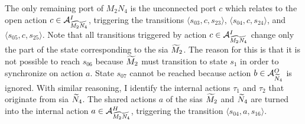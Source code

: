 The only remaining port of $\mathit{M}_2\mathit{N}_4$ is the unconnected port $c$ which relates to the open action $c \in \mathcal{A}_{\widetilde{\mathit{M}_2\mathit{N}_4}}^I$, triggering the transitions $\langle s_{03}, c, s_{23} \rangle$, $\langle s_{04}, c, s_{24} \rangle$, and $\langle s_{05}, c, s_{25} \rangle$.
Note that all transitions triggered by action $c \in \mathcal{A}_{\widetilde{\mathit{M}_2\mathit{N}_4}}^I$ change only the part of the state corresponding to the \gls{sia} $\widetilde{M}_2$.
The reason for this is that it is not possible to reach $s_{06}$ because $\widetilde{M}_2$ must transition to state $s_1$ in order to synchronize on action $a$.
State $s_{07}$ cannot be reached because action $b \in \mathcal{A}_{\widetilde{N}_4}^O$ is ignored.
With similar reasoning, I identify the internal actions $\tau_1$ and $\tau_2$ that originate from \gls{sia} $\widetilde{N}_4$.
The shared actions $a$ of the \glspl{sia} $\widetilde{M}_2$ and $\widetilde{N}_4$ are turned into the internal action $a \in \mathcal{A}_{\widetilde{\mathit{M}_2\mathit{N}_4}}^H$, triggering the transition $\langle s_{04}, a, s_{16} \rangle$.

